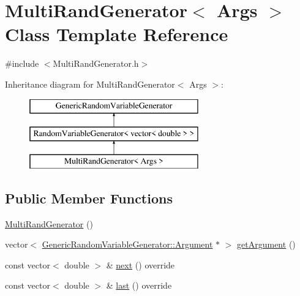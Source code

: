 \hypertarget{class_multi_rand_generator}{}\section{Multi\+Rand\+Generator$<$ Args $>$ Class Template Reference}
\label{class_multi_rand_generator}


{\ttfamily \#include $<$Multi\+Rand\+Generator.\+h$>$}

Inheritance diagram for Multi\+Rand\+Generator$<$ Args $>$\+:\begin{figure}[H]
\begin{center}
\leavevmode
\includegraphics[height=3.000000cm]{class_multi_rand_generator}
\end{center}
\end{figure}
\subsection*{Public Member Functions}
\begin{DoxyCompactItemize}
\item 
\hyperlink{class_multi_rand_generator_abf466c4d24a1c565abe493b26926f3c1}{Multi\+Rand\+Generator} ()
\item 
vector$<$ \hyperlink{class_generic_random_variable_generator_1_1_argument}{Generic\+Random\+Variable\+Generator\+::\+Argument} $\ast$ $>$ \hyperlink{class_multi_rand_generator_ab6309c317d42656c99fa0a81a019a48a}{get\+Argument} ()
\item 
const vector$<$ double $>$ \& \hyperlink{class_multi_rand_generator_a39838e440c70bb6de68052a2ea25e258}{next} () override
\item 
const vector$<$ double $>$ \& \hyperlink{class_multi_rand_generator_abb83dee0545ca24fab2999144de6f0e3}{last} () override
\end{DoxyCompactItemize}
